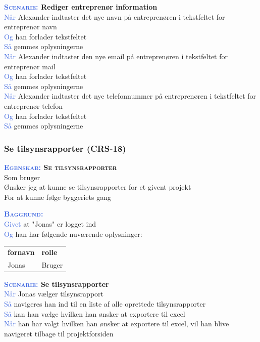 \textbf{\textsc{\textcolor{RoyalBlue}{Scenarie:}} Rediger entreprenør information}\\
\textcolor{RoyalBlue}{Når} Alexander indtaster det nye navn på entreprenøren i tekstfeltet for entreprenør navn \\
\textcolor{RoyalBlue}{Og} han forlader tekstfeltet\\
\textcolor{RoyalBlue}{Så} gemmes oplysningerne\\
\textcolor{RoyalBlue}{Når} Alexander indtaster den nye email på entreprenøren i tekstfeltet for entreprenør mail \\
\textcolor{RoyalBlue}{Og} han forlader tekstfeltet\\
\textcolor{RoyalBlue}{Så} gemmes oplysningerne\\
\textcolor{RoyalBlue}{Når} Alexander indtaster det nye telefonnummer på entreprenøren i tekstfeltet for entreprenør telefon \\
\textcolor{RoyalBlue}{Og} han forlader tekstfeltet\\
\textcolor{RoyalBlue}{Så} gemmes oplysningerne\\

\subsubsection{Se tilsynsrapporter (CRS-18)} \label{sec:USTilsynsrapport}
\textbf{\textsc{\textcolor{RoyalBlue}{Egenskab:} Se tilsynsrapporter}}\\
Som bruger\\
Ønsker jeg at kunne se tilsynsrapporter for et givent projekt\\
For at kunne følge byggeriets gang

\textsc{\textcolor{RoyalBlue}{\textbf{Baggrund:}}}\\
\textcolor{RoyalBlue}{Givet} at "Jonas" er logget ind\\
\textcolor{RoyalBlue}{Og} han har følgende nuværende oplysninger:\\
\begin{tabular}{| l | l |}
	\textbf{fornavn} & \textbf{rolle} \\
	Jonas & Bruger\\
\end{tabular}
\newline

\textbf{\textsc{\textcolor{RoyalBlue}{Scenarie:}} Se tilsynsrapporter}\\
\textcolor{RoyalBlue}{Når} Jonas vælger tilsynsrapport\\
\textcolor{RoyalBlue}{Så} navigeres han ind til en liste af alle oprettede tilsynsrapporter\\
\textcolor{RoyalBlue}{Så} kan han vælge hvilken han ønsker at exportere til excel\\
\textcolor{RoyalBlue}{Når} han har valgt hvilken han ønsker at exportere til excel, vil han blive navigeret tilbage til projektforsiden\\

